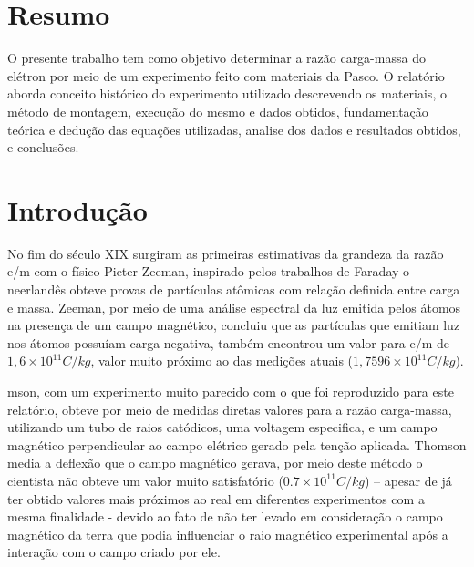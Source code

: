 \section{Resumo}
O presente trabalho tem como objetivo determinar a razão carga-massa do elétron por meio de um experimento feito com materiais da Pasco. O relatório aborda conceito histórico do experimento utilizado descrevendo os materiais, o método de montagem, execução do mesmo e dados obtidos, fundamentação teórica e dedução das equações utilizadas, analise dos dados e resultados obtidos, e conclusões.
\section{Introdução}
No fim do século XIX surgiram as primeiras estimativas da grandeza da razão e/m com o físico Pieter Zeeman, inspirado pelos trabalhos de Faraday o neerlandês obteve provas de partículas atômicas com relação definida entre carga e massa. Zeeman, por meio de uma análise espectral da luz emitida pelos átomos na presença de um campo magnético, concluiu que as partículas que emitiam luz nos átomos possuíam carga negativa, também encontrou um valor para e/m de $1,6\times10^{11} C/kg$, valor muito próximo ao das medições atuais ($1,7596\times10^{11}C/kg$).

mson, com um experimento muito parecido com o que foi reproduzido para este relatório, obteve por meio de medidas diretas valores para a razão carga-massa, utilizando um tubo de raios catódicos, uma voltagem especifica, e um campo magnético perpendicular ao campo elétrico gerado pela tenção aplicada. Thomson media a deflexão que o campo magnético gerava, por meio deste método o cientista não obteve um valor muito satisfatório ($0.7\times10^{11} C/kg$) – apesar de já ter obtido valores mais próximos ao real em diferentes experimentos com a mesma finalidade - devido ao fato de não ter levado em consideração o campo magnético da terra que podia influenciar o raio magnético experimental após a interação com o campo criado por ele. 
